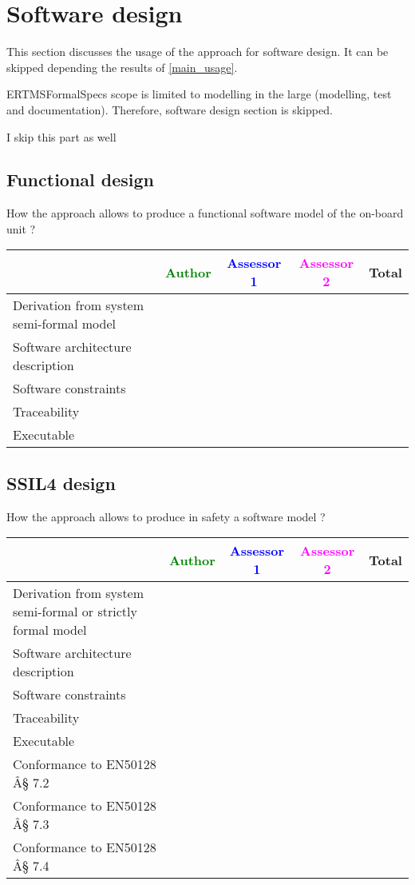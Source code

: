 \section{Software design}
This section discusses the usage of the approach for software design.
It can be skipped depending the results of \ref{main_usage}.

\begin{author_comment}
ERTMSFormalSpecs scope is limited to modelling in the large (modelling, test and documentation). Therefore, software design section is skipped.  
\end{author_comment}

\begin{assessor1}
I skip this part as well
\end{assessor1}

\subsection{Functional design}

How the approach allows to  produce a functional software model of the on-board unit ?

\begin{tabular}{|l | c | c | c | c|}
\hline
& \textcolor{green}{Author} & \textcolor{blue}{Assessor 1} & \textcolor{magenta}{Assessor 2} & Total \\
\hline
Derivation from system semi-formal model  & & & &  \\
\hline 
Software architecture description  & & & &  \\
\hline
Software constraints  & & & &  \\
\hline
Traceability  & & & &  \\
\hline
Executable  & & & &  \\
\hline
\end{tabular}

\subsection{SSIL4 design}

How the approach allows to  produce in safety a software model ?

\begin{tabular}{|l | c | c | c | c|}
\hline
& \textcolor{green}{Author} & \textcolor{blue}{Assessor 1} & \textcolor{magenta}{Assessor 2} & Total \\
\hline
Derivation from system semi-formal or strictly formal model  & & & &  \\
\hline 
Software architecture description  & & & &  \\
\hline
Software constraints  & & & &  \\
\hline
Traceability  & & & &  \\
\hline
Executable  & & & &  \\
\hline
Conformance to EN50128 Â§ 7.2  & & & &  \\
\hline
Conformance to EN50128 Â§ 7.3  & & & &  \\
\hline
Conformance to EN50128 Â§ 7.4  & & & &  \\
\hline
\end{tabular}

